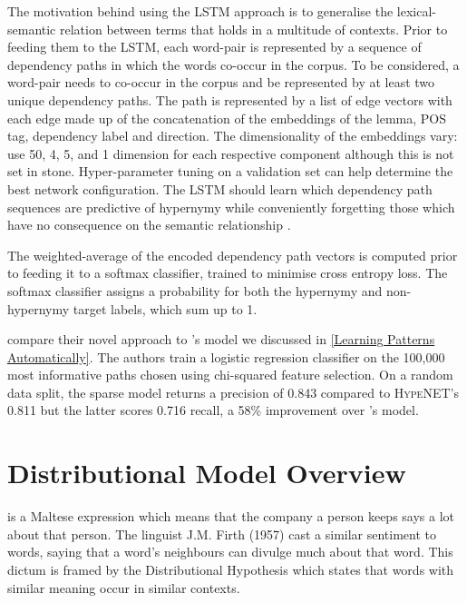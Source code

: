 The motivation behind using the \ac{LSTM} approach is to generalise the lexical-semantic relation between terms that holds in a multitude of contexts.  Prior to feeding them to the \ac{LSTM}, each word-pair is represented by a sequence of dependency paths in which the words co-occur in the corpus.  To be considered, a word-pair needs to co-occur in the corpus and be represented by at least two unique dependency paths.  The path is represented by a list of edge vectors with each edge made up of the concatenation of the embeddings of the lemma, \ac{POS} tag, dependency label and direction.  The dimensionality of the embeddings vary: \citeauthor{shwartz2016path} use 50, 4, 5, and 1 dimension for each respective component \citep{shwartz2016path} although this is not set in stone.  Hyper-parameter tuning on a validation set can help determine the best network configuration.  The \ac{LSTM} should learn which dependency path sequences are predictive of hypernymy while conveniently forgetting those which have no consequence on the semantic relationship \citep{shwartz2016path}.

The weighted-average of the encoded dependency path vectors is computed prior to feeding it to a softmax classifier, trained to minimise cross entropy loss.  The softmax classifier assigns a probability for both the hypernymy and non-hypernymy target labels, which sum up to 1.

\citeauthor{shwartz2016path} compare their novel approach to \citeauthor{Snow2004}'s model \citep{Snow2004} we discussed in \cref{Learning Patterns Automatically}. The authors train a logistic regression classifier on the 100,000 most informative paths chosen using chi-squared feature selection.  On a random data split, the sparse model returns a precision of 0.843 compared to \textsc{HypeNET}’s 0.811 but the latter scores 0.716 recall, a 58\% improvement over \citeauthor{Snow2004}'s model.    

\section{Distributional Model Overview}
 is a Maltese expression which means that the company a person keeps says a lot about that person.  The linguist J.M. Firth (1957) cast a similar sentiment to words, saying that a word’s neighbours can divulge much about that word.  This dictum is framed by the Distributional Hypothesis \citep{harris1954distributional} which states that words with similar meaning occur in similar contexts.  

